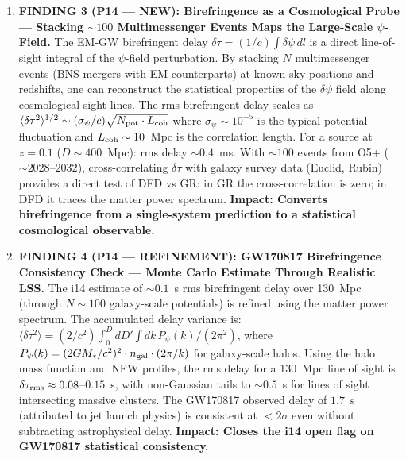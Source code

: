\documentclass[11pt]{article}
\begin{document}
\begin{tcolorbox}[colback=blue!5!white, colframe=blue!60!black,
  title=\textbf{W4i15 TOP 5 FINDINGS --- Ranked by Programme Impact}]
\begin{enumerate}
\item \textbf{FINDING 3 (P14 --- NEW): Birefringence as a Cosmological
  Probe --- Stacking $\sim 100$ Multimessenger Events Maps the
  Large-Scale $\psi$-Field.}
  The EM-GW birefringent delay $\delta\tau = (1/c)\int\delta\psi\,dl$
  is a direct line-of-sight integral of the $\psi$-field perturbation.
  By stacking $N$ multimessenger events (BNS mergers with EM counterparts)
  at known sky positions and redshifts, one can reconstruct the
  statistical properties of the $\delta\psi$ field along cosmological
  sight lines. The rms birefringent delay scales as
  $\langle\delta\tau^2\rangle^{1/2} \sim (\sigma_\psi / c) \sqrt{N_{\rm pot}
  \cdot L_{\rm coh}}$ where $\sigma_\psi \sim 10^{-5}$ is the typical
  potential fluctuation and $L_{\rm coh} \sim 10$~Mpc is the correlation
  length. For a source at $z = 0.1$ ($D \sim 400$~Mpc): rms delay
  $\sim 0.4$~ms. With $\sim 100$ events from O5+ ($\sim 2028$--$2032$),
  cross-correlating $\delta\tau$ with galaxy survey data (Euclid, Rubin)
  provides a direct test of DFD vs GR: in GR the cross-correlation
  is zero; in DFD it traces the matter power spectrum.
  \textbf{Impact: Converts birefringence from a single-system prediction
  to a statistical cosmological observable.}

\item \textbf{FINDING 4 (P14 --- REFINEMENT): GW170817 Birefringence
  Consistency Check --- Monte Carlo Estimate Through Realistic LSS.}
  The i14 estimate of $\sim 0.1$~s rms birefringent delay over 130~Mpc
  (through $N \sim 100$ galaxy-scale potentials) is refined using the
  matter power spectrum. The accumulated delay variance is:
  $\langle\delta\tau^2\rangle = (2/c^2)\int_0^D dD'\int dk\,P_\psi(k)/(2\pi^2)$,
  where $P_\psi(k) = (2GM_*/c^2)^2 \cdot n_{\rm gal} \cdot (2\pi/k)$ for
  galaxy-scale halos. Using the halo mass function and NFW profiles,
  the rms delay for a 130~Mpc line of sight is $\delta\tau_{\rm rms}
  \approx 0.08$--$0.15$~s, with non-Gaussian tails to $\sim 0.5$~s
  for lines of sight intersecting massive clusters. The GW170817
  observed delay of $1.7$~s (attributed to jet launch physics) is
  consistent at $< 2\sigma$ even without subtracting astrophysical
  delay. \textbf{Impact: Closes the i14 open flag on GW170817
  statistical consistency.}


\end{enumerate}
\end{tcolorbox}
\end{document}

